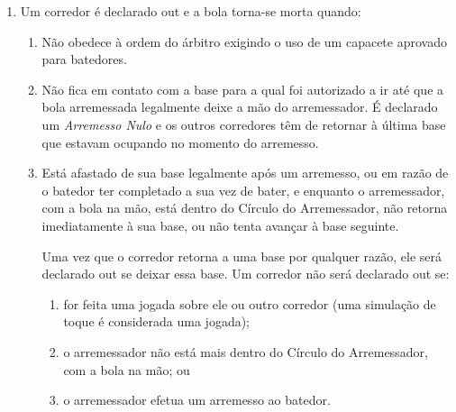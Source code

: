 \begin{multicols}{2}
\begin{enumerate}[label=\alph*)]
\begin{enumerate}[label=\roman*.]
			\item Ap\'os passar correndo ou deslizando pelo \gls{homeplate}, sem pis\'a-lo, n\~ao tenta retornar para reparar a falha, e um defensor, com a bola na (s) m\~ao (s) e enquanto mant\'em contato com o \gls{plate}, apela ao \'arbitro por uma decis\~ao. 
			\item Abandona uma base e entra na \'area de sua equipe, ou deixa o campo de jogo, enquanto a bola est\'a viva. 
			\item Em qualquer bola \gls{fly}, se posiciona atr\'as da base e n\~ao fica em contato com ela, para iniciar a corrida \`a base seguinte tomando impulso a partir dessa posi\c{c}\~ao, ou seja, para fazer um \gls{running start}. 
			\item Quando corredores mudam de posi\c{c}\~oes nas bases. 
		\end{enumerate}
		\item  Um corredor \'e declarado \gls{out} e a bola torna-se morta quando: 
		\begin{enumerate}[label=\roman*.]
			\item N\~ao obedece \`a ordem do \'arbitro exigindo o uso de um capacete aprovado para batedores. 
			\item N\~ao fica em contato com a base para a qual foi autorizado a ir at\'e que a bola arremessada legalmente deixe a m\~ao do arremessador. \'E declarado um \textsl{Arremesso Nulo} e os outros corredores t\^em de retornar \`a \'ultima base que estavam ocupando no momento do arremesso. 
			\item Est\'a afastado de sua base legalmente ap\'os um arremesso, ou em raz\~ao de o batedor ter completado a sua vez de bater, e enquanto o arremessador, com a bola na m\~ao, est\'a dentro do C\'irculo do Arremessador, n\~ao retorna imediatamente \`a sua base, ou n\~ao tenta avan\c{c}ar \`a base seguinte. 
			
			Uma vez que o corredor retorna a uma base por qualquer raz\~ao, ele ser\'a declarado \gls{out} se deixar essa base. Um corredor n\~ao ser\'a declarado \gls{out} se: 
			
			\begin{enumerate}[label=\arabic*)]
				\item for feita uma jogada sobre ele ou outro corredor (uma simula\c{c}\~ao de toque \'e considerada uma jogada); 
				\item o arremessador n\~ao est\'a mais dentro do C\'irculo do Arremessador, com a bola na m\~ao; ou 
				\item o arremessador efetua um arremesso ao batedor. 
				

\end{enumerate}
\end{enumerate}
\end{enumerate}
\end{multicols}
